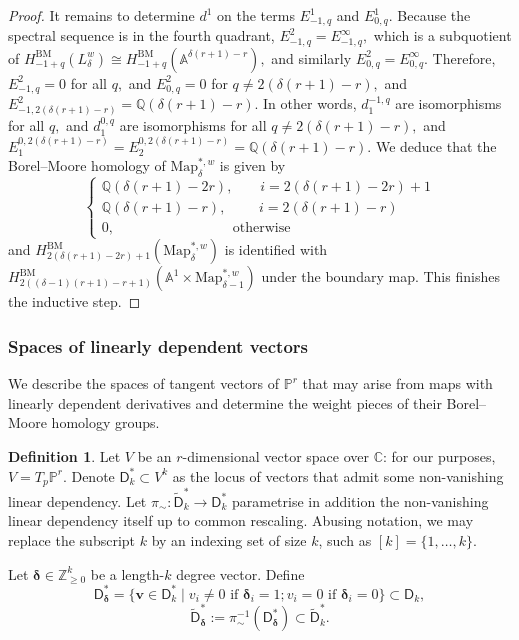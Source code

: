 \documentclass[12pt,reqno]{amsart}
\theoremstyle{definition}
\theoremstyle{definition}
\theoremstyle{definition}
\theoremstyle{definition}
\newtheorem{definition}[theorem]{Definition}
\begin{document}
\begin{proof}
  It remains to determine $d^1$ on the terms $E^1_{-1,q}$ and $E^1_{0,q}.$ Because the spectral sequence is in the fourth quadrant, $E^2_{-1,q} = E^{\infty}_{-1,q},$ which is a subquotient of $H^{\mathrm{BM}}_{-1+q}(L_{\delta}^{w})\cong H^{\mathrm{BM}}_{-1+q}(\mathbb{A}^{\delta(r+1)-r}),$ and similarly $E^2_{0,q} = E^{\infty}_{0,q}.$ Therefore, $E^2_{-1,q}=0$ for all $q,$ and $E^2_{0,q} = 0$ for $q\neq 2(\delta(r+1)-r),$ and $E^2_{-1,2(\delta(r+1)-r)}=\mathbb{Q}(\delta(r+1)-r).$ In other words, $d_1^{-1,q}$ are isomorphisms for all $q,$ and $d_1^{0,q}$ are isomorphisms for all $q\neq 2(\delta(r+1)-r),$ and $E_1^{0, 2(\delta(r+1)-r)} = E_2^{0, 2(\delta(r+1)-r)} =\mathbb{Q}(\delta(r+1)-r).$ We deduce that the Borel--Moore homology of $\mathrm{Map}_{\delta}^{*,w}$ is given by $$\begin{cases*}
    \mathbb{Q}(\delta(r+1)-2r), \hspace{23pt} i = 2(\delta(r+1)-2r)+1\\
    \mathbb{Q}(\delta(r+1)-r), \hspace{28pt} i=2(\delta(r+1)-r) \\
    0, \hspace{101pt} \text{otherwise}
  \end{cases*}$$ and $H_{2(\delta(r+1)-2r)+1}^{\mathrm{BM}}(\mathrm{Map}_{\delta}^{*,w})$ is identified with $H_{2((\delta-1)(r+1)-r+1)}^{\mathrm{BM}}(\mathbb{A}^1\times \mathrm{Map}_{\delta-1}^{*,w})$ under the boundary map. This finishes the inductive step.
\end{proof}

\subsubsection{Spaces of linearly dependent vectors}
We describe the spaces of tangent vectors of $\mathbb{P}^r$ that may arise from maps with linearly dependent derivatives and determine the weight pieces of their Borel--Moore homology groups.

\begin{definition}
  Let \(V\) be an \(r\)-dimensional vector space over \(\mathbb{C}\): for our purposes, \(V= T_p \mathbb{P}^r\). Denote $\mathsf{D}_k^*\subset V^k$ as the locus of vectors that admit some non-vanishing linear dependency. Let \(\pi_{\sim}:\widetilde{\mathsf{D}}_k^* \to \mathsf{D}_k^*\) parametrise in addition the non-vanishing linear dependency itself up to common rescaling. Abusing notation, we may replace the subscript $k$ by an indexing set of size $k$, such as $[k] = \{1,\dots,k\}.$
  
  Let $\boldsymbol{\delta}\in \mathbb{Z}_{\geq 0}^k$ be a length-$k$ degree vector. Define \[\mathsf{D}_{\boldsymbol{\delta}}^* = \{\mathbf{v}\in {\mathsf{D}}^*_{k}\mid v_i\neq 0\text{ if }\boldsymbol{\delta}_i = 1; v_i= 0 \text{ if }\boldsymbol{\delta}_i = 0\}\subset \mathsf{D}_k,\] \[{\widetilde{\mathsf{D}}}^*_{\boldsymbol{\delta}}:=\pi_{\sim}^{-1}(\mathsf{D}_{\boldsymbol{\delta}}^*)\subset \widetilde{\mathsf{D}}_k^*.\]
\end{definition}
\end{document}
